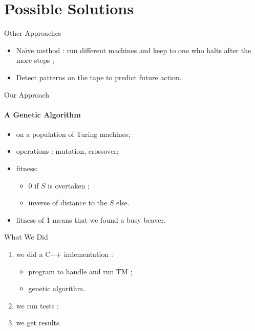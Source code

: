 \documentclass{beamer}
\begin{document}
\section{Possible Solutions}

\begin{frame}{Other Approaches}

\begin{itemize}
\item Naïve method : run different machines and keep to one who halts after the more steps ; %
\item Detect patterns on the tape to predict future action.
\end{itemize}

\end{frame}

\begin{frame}{Our Approach}
\framesubtitle{A Genetic Algorithm}

\begin{itemize}
\item on a population of Turing machines;
\item operations : mutation, crossover;
\item fitness:
  \begin{itemize}
  \item 0 if $S$ is overtaken ;
  \item inverse of distance to the $S$ else.
  \end{itemize}
\item fitness of 1 means that we found a busy beaver.
\end{itemize}

\end{frame}

\begin{frame}{What We Did}

\begin{enumerate}
\item we did a C++ imlementation :
  \begin{itemize}
  \item program to handle and run TM ;
  \item genetic algorithm.
  \end{itemize}
\item we run tests ;
\item we get results.
\end{enumerate}
\end{frame}
\end{document}
